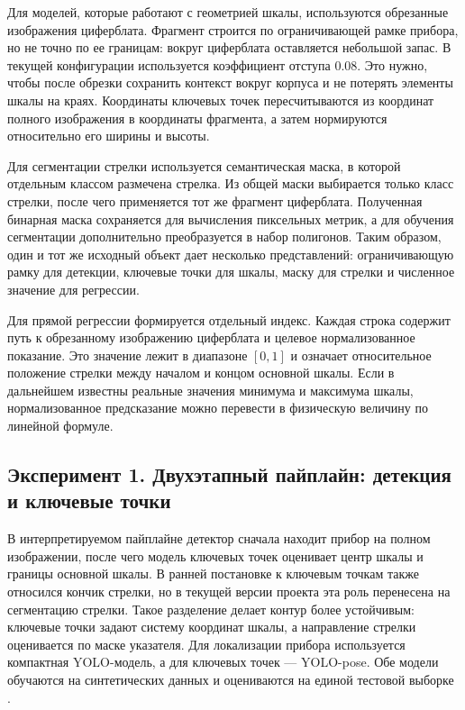 \documentclass[a4paper,14pt]{extarticle}
\begin{document}
Для моделей, которые работают с геометрией шкалы, используются обрезанные изображения циферблата. Фрагмент строится по ограничивающей рамке прибора, но не точно по ее границам: вокруг циферблата оставляется небольшой запас. В текущей конфигурации используется коэффициент отступа 0.08. Это нужно, чтобы после обрезки сохранить контекст вокруг корпуса и не потерять элементы шкалы на краях. Координаты ключевых точек пересчитываются из координат полного изображения в координаты фрагмента, а затем нормируются относительно его ширины и высоты.

Для сегментации стрелки используется семантическая маска, в которой отдельным классом размечена стрелка. Из общей маски выбирается только класс стрелки, после чего применяется тот же фрагмент циферблата. Полученная бинарная маска сохраняется для вычисления пиксельных метрик, а для обучения сегментации дополнительно преобразуется в набор полигонов. Таким образом, один и тот же исходный объект дает несколько представлений: ограничивающую рамку для детекции, ключевые точки для шкалы, маску для стрелки и численное значение для регрессии.

Для прямой регрессии формируется отдельный индекс. Каждая строка содержит путь к обрезанному изображению циферблата и целевое нормализованное показание. Это значение лежит в диапазоне $[0, 1]$ и означает относительное положение стрелки между началом и концом основной шкалы. Если в дальнейшем известны реальные значения минимума и максимума шкалы, нормализованное предсказание можно перевести в физическую величину по линейной формуле.

	\subsection{Эксперимент 1. Двухэтапный пайплайн: детекция и ключевые точки}

	В интерпретируемом пайплайне детектор сначала находит прибор на полном изображении, после чего модель ключевых точек оценивает центр шкалы и границы основной шкалы. В ранней постановке к ключевым точкам также относился кончик стрелки, но в текущей версии проекта эта роль перенесена на сегментацию стрелки. Такое разделение делает контур более устойчивым: ключевые точки задают систему координат шкалы, а направление стрелки оценивается по маске указателя. Для локализации прибора используется компактная YOLO-модель, а для ключевых точек --- YOLO-pose. Обе модели обучаются на синтетических данных и оцениваются на единой тестовой выборке \cite{yoloSurvey2022,vasilyev2025,howells2021,reitsma2024,peng2024}.
\end{document}
